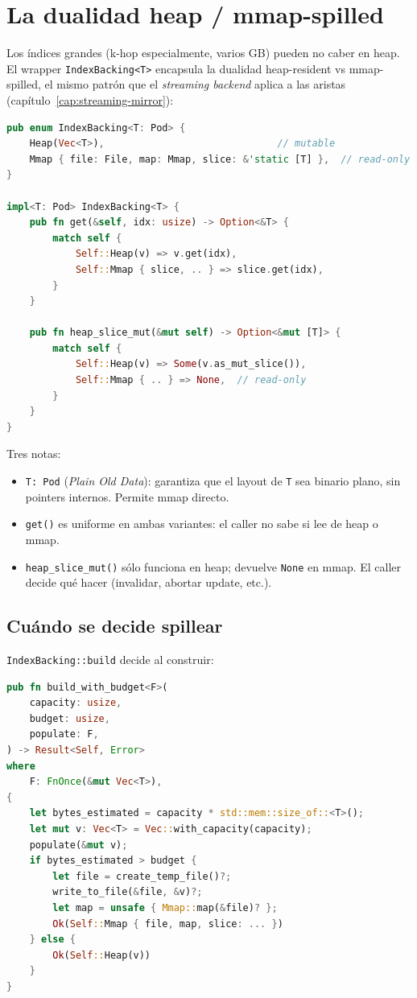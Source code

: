 \section{La dualidad heap / mmap-spilled}

Los índices grandes (k-hop especialmente, varios GB) pueden no
caber en heap. El wrapper \texttt{IndexBacking<T>} encapsula la
dualidad heap-resident vs mmap-spilled, el mismo patrón que el
\emph{streaming backend} aplica a las aristas
(capítulo~\ref{cap:streaming-mirror}):

\begin{lstlisting}[language=Rust]
pub enum IndexBacking<T: Pod> {
    Heap(Vec<T>),                              // mutable
    Mmap { file: File, map: Mmap, slice: &'static [T] },  // read-only
}

impl<T: Pod> IndexBacking<T> {
    pub fn get(&self, idx: usize) -> Option<&T> {
        match self {
            Self::Heap(v) => v.get(idx),
            Self::Mmap { slice, .. } => slice.get(idx),
        }
    }

    pub fn heap_slice_mut(&mut self) -> Option<&mut [T]> {
        match self {
            Self::Heap(v) => Some(v.as_mut_slice()),
            Self::Mmap { .. } => None,  // read-only
        }
    }
}
\end{lstlisting}

\noindent
Tres notas:

\begin{itemize}
    \item \texttt{T: Pod} (\emph{Plain Old Data}): garantiza que el
    layout de \texttt{T} sea binario plano, sin pointers internos.
    Permite mmap directo.
    \item \texttt{get()} es uniforme en ambas variantes: el caller
    no sabe si lee de heap o mmap.
    \item \texttt{heap\_slice\_mut()} sólo funciona en heap;
    devuelve \texttt{None} en mmap. El caller decide qué hacer
    (invalidar, abortar update, etc.).
\end{itemize}

\subsection{Cuándo se decide spillear}

\texttt{IndexBacking::build} decide al construir:

\begin{lstlisting}[language=Rust]
pub fn build_with_budget<F>(
    capacity: usize,
    budget: usize,
    populate: F,
) -> Result<Self, Error>
where
    F: FnOnce(&mut Vec<T>),
{
    let bytes_estimated = capacity * std::mem::size_of::<T>();
    let mut v: Vec<T> = Vec::with_capacity(capacity);
    populate(&mut v);
    if bytes_estimated > budget {
        let file = create_temp_file()?;
        write_to_file(&file, &v)?;
        let map = unsafe { Mmap::map(&file)? };
        Ok(Self::Mmap { file, map, slice: ... })
    } else {
        Ok(Self::Heap(v))
    }
}
\end{lstlisting}

